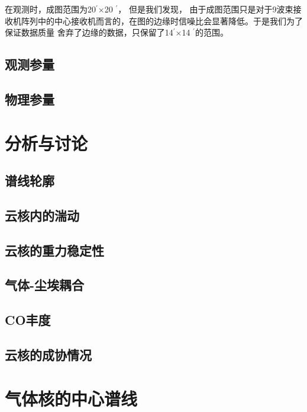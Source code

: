 \documentclass[UTF8]{pkuthss}
\newcommand{\multi}{$\times$}
\newcommand{\arcmin}{$^{\prime}$}
\begin{document}
        在观测时，成图范围为20\arcmin \multi 20 \arcmin ， 但是我们发现， 由于成图范围只是对于9波束接收机阵列中的中心接收机而言的，在图的边缘时信噪比会显著降低。于是我们为了保证数据质量 舍弃了边缘的数据，只保留了14\arcmin \multi 14 \arcmin 的范围。

	\section{观测参量}
	\section{物理参量}
\chapter{分析与讨论}
	\section{谱线轮廓}
	\section{云核内的湍动}
	\section{云核的重力稳定性}
	\section{气体-尘埃耦合}
	\section{CO丰度}
	\section{云核的成协情况}
	\appendix
	\printbibliography[
		heading = bibintoc,
	]
\iffalse
\chapter{气体核的中心谱线}
\end{document}
